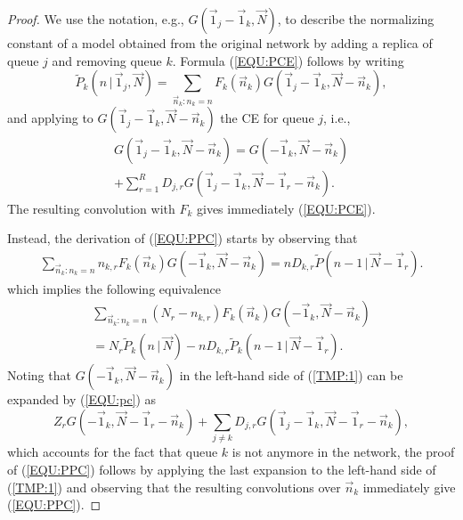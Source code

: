 \documentclass[journal,twocolumn,9.5pt]{IEEEtran}
\begin{document}
\begin{proof}
We use the notation, e.g., $G(\vec 1_j-\vec 1_k,\vec N)$, to describe the normalizing constant of a model obtained from the original network by adding a replica of queue $j$ and removing queue $k$.
Formula (\ref{EQU:PCE}) follows by writing
\begin{equation}
\textstyle \widetilde{P}_k(n\,|\,\vec 1_j, \vec N)=\sum_{\vec n_k:n_k=n} F_k(\vec n_k)G(\vec 1_j-\vec 1_k,\vec N-\vec n_k), \nonumber
\end{equation}
and applying to $G(\vec 1_j-\vec 1_k,\vec N-\vec n_k)$ the CE for queue $j$, i.e.,
\begin{multline}
\textstyle G(\vec 1_j-\vec 1_k,\vec N-\vec n_k)=G(-\vec 1_k, \vec N-\vec n_k)\\\textstyle +\sum_{r=1}^R D_{j,r}G(\vec 1_j-\vec 1_k,\vec N-\vec 1_r-\vec n_k). \nonumber
\end{multline}
The resulting convolution with $F_k$ gives immediately (\ref{EQU:PCE}).

Instead, the derivation of (\ref{EQU:PPC}) starts by observing that
\begin{multline}
\textstyle  \sum_{\vec n_k:n_k=n} n_{k,r}F_k(\vec n_k)G(-\vec 1_k,\vec N-\vec n_k)=nD_{k,r}\widetilde{P}(n-1\,|\,\vec N-\vec 1_r). \nonumber
\end{multline}
which implies the following equivalence
\begin{multline}
\label{TMP:1}
\textstyle  \sum_{\vec n_k:n_k=n} (N_r - n_{k,r})F_k(\vec n_k)G(-\vec 1_k,\vec N-\vec n_k)\\
\textstyle =N_r\widetilde{P}_k(n\,|\, \vec N)-nD_{k,r}\widetilde{P}_k(n-1\,|\, \vec N-\vec 1_r).
\end{multline}
Noting that $G(-\vec 1_k,\vec N-\vec n_k)$ in the left-hand side of (\ref{TMP:1}) can be expanded by (\ref{EQU:pc}) as
$$\textstyle Z_{r}G(-\vec 1_k,\vec N-\vec 1_r-\vec n_k)+\sum_{j\neq k} D_{j,r}G(\vec 1_j-\vec 1_k,\vec N-\vec 1_r-\vec n_k),$$
which accounts for the fact that queue $k$ is not anymore in the network, the proof of (\ref{EQU:PPC}) follows by applying the last expansion to the left-hand side of (\ref{TMP:1}) and observing that the resulting convolutions over $\vec n_k$ immediately give (\ref{EQU:PPC}).
\end{proof}
\end{document}
